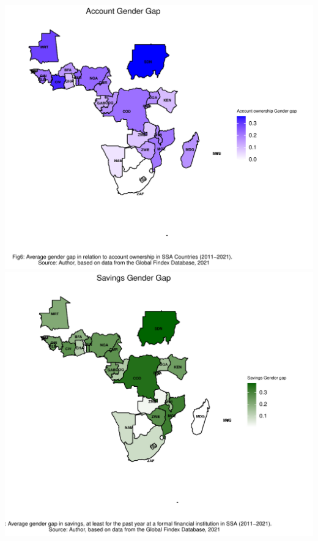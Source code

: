 \documentclass[preprint, 3p,
authoryear]{elsarticle} %
\begin{document}
\includegraphics{504.Project1_files/figure-latex/unnamed-chunk-4-1.pdf}
\includegraphics{504.Project1_files/figure-latex/unnamed-chunk-4-2.pdf}
\end{document}
